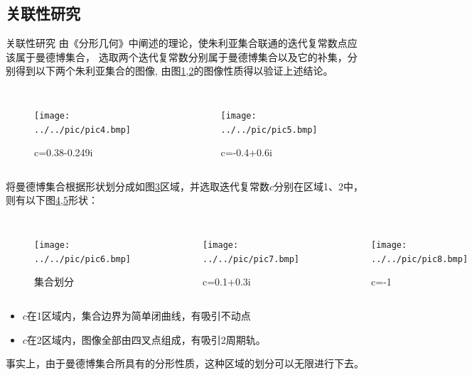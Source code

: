 \documentclass[8pt,c,compress,UTF8]{beamer}
\begin{document}
\subsection{关联性研究}
\begin{frame}{关联性研究}
由《分形几何》\cite{1997Techniques}中阐述的理论，使朱利亚集合联通的迭代复常数点应该属于曼德博集合，
选取两个迭代复常数分别属于曼德博集合以及它的补集，分别得到以下两个朱利亚集合的图像,
由图\ref{pic::4},\ref{pic::5}的图像性质得以验证上述结论。
\begin{columns}
    \begin{figure}[H]
        \centering
        \texttt{[image: ../../pic/pic4.bmp]}
        \caption{c=0.38-0.249i}
        \label{pic::4}
    \end{figure}

    \begin{figure}[H] 
    \centering 
    \texttt{[image: ../../pic/pic5.bmp]} 
    \caption{c=-0.4+0.6i} 
    \label{pic::5}
    \end{figure}
\end{columns}

将曼德博集合根据形状划分成如图\ref{pic::6}区域，并选取迭代复常数$c$分别在区域1、2中，
则有以下图\ref{pic::7},\ref{pic::8}形状：


\begin{columns}
    \begin{figure}[H]
        \centering
        \texttt{[image: ../../pic/pic6.bmp]}
        \caption{集合划分}
        \label{pic::6}
    \end{figure}

    \begin{figure}[H] 
    \centering 
    \texttt{[image: ../../pic/pic7.bmp]} 
    \caption{c=0.1+0.3i} 
    \label{pic::7}
    \end{figure}

    \begin{figure}[H] 
    \centering 
    \texttt{[image: ../../pic/pic8.bmp]} 
    \caption{c=-1} 
    \label{pic::8}
    \end{figure}
\end{columns}

\begin{itemize}
    \setlength{\itemsep}{1pt}
    \item $c$在1区域内，集合边界为简单闭曲线，有吸引不动点
    \item $c$在2区域内，图像全部由四叉点组成，有吸引2周期轨。
\end{itemize}
事实上，由于曼德博集合所具有的分形性质，这种区域的划分可以无限进行下去。

\end{frame}
\end{document}
